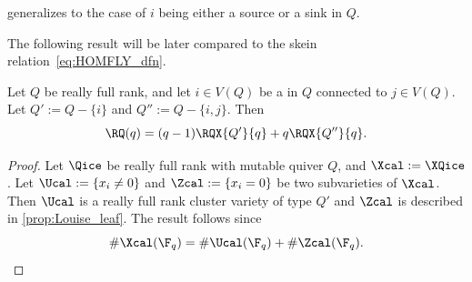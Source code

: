 \begin{remark}
 generalizes to the case of $i$ being either a source or a sink in $Q$.
\end{remark}
The following result will be later compared to the \FLY skein relation~\eqref{eq:HOMFLY_dfn}.
\begin{corollary}\label{cor:RQ_skein}
  Let $Q$ be really full rank, and let $i\in V(Q)$ be a \Louiseleaf in $Q$ connected to $j\in V(Q)$. Let $Q':=Q-\{i\}$ and $Q'':=Q-\{i,j\}$. Then
  \begin{equation}\label{eq:RQ_skein}
    \RQ(q)=(q-1)\RQX{Q'}{q} + q\RQX{Q''}{q}.
  \end{equation}
\end{corollary}
\begin{proof}
  Let $\Qice$ be really full rank with mutable quiver $Q$, and $\Xcal:=\XQice$. Let $\Ucal:=\{x_i\neq0\}$ and $\Zcal:=\{x_i=0\}$ be two subvarieties of $\Xcal$. Then $\Ucal$ is a really full rank cluster variety of type $Q'$ and $\Zcal$ is described in \cref{prop:Louise_leaf}. The result follows since
  \begin{equation*}%
    \#\Xcal(\F_q)=\#\Ucal(\F_q) + \#\Zcal(\F_q).    \qedhere
  \end{equation*}
\end{proof}
